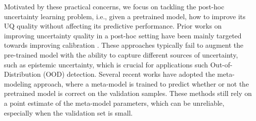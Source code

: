 Motivated by these practical concerns, we focus on tackling the post-hoc uncertainty learning problem, i.e., given a pretrained model, how to improve its UQ quality without affecting its predictive performance. %
Prior works on improving uncertainty quality in a post-hoc setting have been mainly targeted towards improving calibration \citep{guo2017calibration,kull2019beyond}. These approaches typically fail to augment the pre-trained model with the ability to capture different sources of uncertainty, such as epistemic uncertainty, which is crucial for applications such Out-of-Distribution (OOD) detection. Several recent works \citep{chen2019confidence,jain2021deup} have adopted the meta-modeling approach, where a meta-model is trained to predict whether or not the pretrained model is correct on the validation samples. These methods still rely on a point estimate of the meta-model parameters, which can be unreliable, especially when the validation set is small. 

